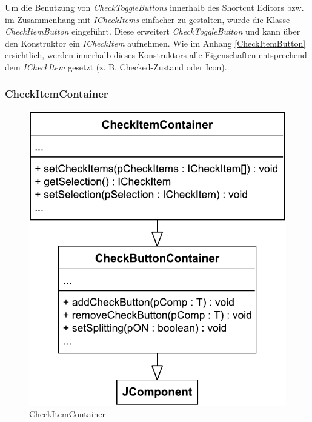 \vspace{-9px}

Um die Benutzung von \emph{CheckToggleButtons} innerhalb des Shortcut Editors bzw. im Zusammenhang mit \emph{ICheckItems} einfacher zu gestalten, wurde die Klasse \emph{CheckItemButton} eingeführt. Diese erweitert \emph{CheckToggleButton} und kann über den Konstruktor ein \emph{ICheckItem} aufnehmen. Wie im Anhang \ref{CheckItemButton} ersichtlich, werden innerhalb dieses Konstruktors alle Eigenschaften entsprechend dem \emph{ICheckItem} gesetzt (z. B. Checked-Zustand oder Icon).

\vspace{-9px}

\subsubsection{CheckItemContainer}

\vspace{-3px}

\begin{figure}
	\vspace{-12px}
	\centering
	\includegraphics[width=.95\linewidth]{../graphic/diagrams/CD_CheckItemContainer/CD_CheckItemContainer}
	\caption{CheckItemContainer}
	\label{fig:cdcheckitemcontainer}
\end{figure}

